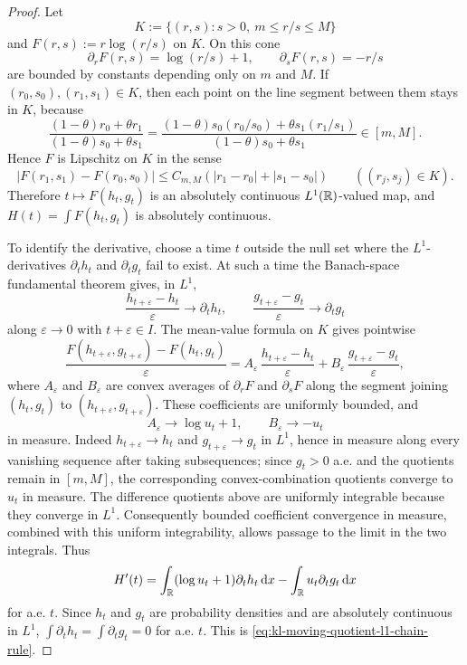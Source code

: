 \begin{proof}
Let
\[
K:=\{(r,s):s>0,\ m\le r/s\le M\}
\]
and \(F(r,s):=r\log(r/s)\) on \(K\).  On this cone
\[
\partial_rF(r,s)=\log(r/s)+1,\qquad
\partial_sF(r,s)=-r/s
\]
are bounded by constants depending only on \(m\) and \(M\).  If
\((r_0,s_0),(r_1,s_1)\in K\), then each point on the line segment between
them stays in \(K\), because
\[
\frac{(1-\theta)r_0+\theta r_1}
{(1-\theta)s_0+\theta s_1}
=
\frac{(1-\theta)s_0(r_0/s_0)+\theta s_1(r_1/s_1)}
{(1-\theta)s_0+\theta s_1}
\in[m,M].
\]
Hence \(F\) is Lipschitz on \(K\) in the sense
\[
|F(r_1,s_1)-F(r_0,s_0)|
\le C_{m,M}(|r_1-r_0|+|s_1-s_0|)
\qquad ((r_j,s_j)\in K).
\]
Therefore \(t\mapsto F(h_t,g_t)\) is an absolutely continuous
\(L^1(\mathbb{R})\)-valued map, and \(H(t)=\int F(h_t,g_t)\) is absolutely
continuous.

To identify the derivative, choose a time \(t\) outside the null set where the
\(L^1\)-derivatives \(\partial_th_t\) and \(\partial_tg_t\) fail to exist.
At such a time the Banach-space fundamental theorem gives, in \(L^1\),
\[
\frac{h_{t+\varepsilon}-h_t}{\varepsilon}\to\partial_th_t,\qquad
\frac{g_{t+\varepsilon}-g_t}{\varepsilon}\to\partial_tg_t
\]
along \(\varepsilon\to0\) with \(t+\varepsilon\in I\).  The mean-value formula
on \(K\) gives pointwise
\[
\frac{F(h_{t+\varepsilon},g_{t+\varepsilon})-F(h_t,g_t)}{\varepsilon}
=A_\varepsilon\,\frac{h_{t+\varepsilon}-h_t}{\varepsilon}
+ B_\varepsilon\,\frac{g_{t+\varepsilon}-g_t}{\varepsilon},
\]
where \(A_\varepsilon\) and \(B_\varepsilon\) are convex averages of
\(\partial_rF\) and \(\partial_sF\) along the segment joining
\((h_t,g_t)\) to \((h_{t+\varepsilon},g_{t+\varepsilon})\).  These
coefficients are uniformly bounded, and
\[
A_\varepsilon\to \log u_t+1,\qquad B_\varepsilon\to -u_t
\]
in measure.  Indeed \(h_{t+\varepsilon}\to h_t\) and
\(g_{t+\varepsilon}\to g_t\) in \(L^1\), hence in measure along every
vanishing sequence after taking subsequences; since \(g_t>0\) a.e. and the
quotients remain in \([m,M]\), the corresponding convex-combination quotients
converge to \(u_t\) in measure.  The difference quotients above are uniformly
integrable because they converge in \(L^1\).  Consequently bounded
coefficient convergence in measure, combined with this uniform
integrability, allows passage to the limit in the two integrals.  Thus
\[
H'(t)
=\int_{\mathbb{R}}(\log u_t+1)\partial_th_t\,\mathrm{d} x
-\int_{\mathbb{R}}u_t\partial_tg_t\,\mathrm{d} x
\]
for a.e. \(t\).  Since \(h_t\) and \(g_t\) are probability densities and are
absolutely continuous in \(L^1\),
\(\int\partial_th_t=\int\partial_tg_t=0\) for a.e. \(t\).  This is
\eqref{eq:kl-moving-quotient-l1-chain-rule}.
\end{proof}

